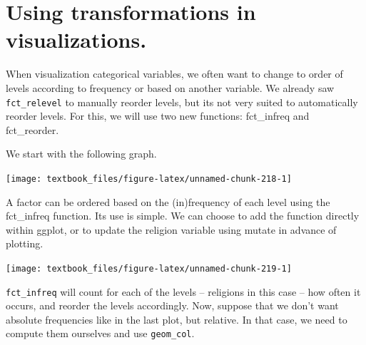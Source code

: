 \documentclass[]{tufte-book}
\newenvironment{Shaded}{}{}
\newcommand{\KeywordTok}[1]{\textcolor[rgb]{0.00,0.44,0.13}{\textbf{#1}}}
\newcommand{\NormalTok}[1]{#1}
\newcommand{\OperatorTok}[1]{\textcolor[rgb]{0.40,0.40,0.40}{#1}}
\newcommand{\StringTok}[1]{\textcolor[rgb]{0.25,0.44,0.63}{#1}}
\begin{document}
\hypertarget{using-transformations-in-visualizations.}{%
\section{Using transformations in visualizations.}\label{using-transformations-in-visualizations.}}

When visualization categorical variables, we often want to change to order of levels according to frequency or based on another variable. We already saw \texttt{fct\_relevel} to manually reorder levels, but its not very suited to automatically reorder levels. For this, we will use two new functions: fct\_infreq and fct\_reorder.

We start with the following graph.

\begin{Shaded}
\end{Shaded}

\texttt{[image: textbook\_files/figure-latex/unnamed-chunk-218-1]}

A factor can be ordered based on the (in)frequency of each level using the fct\_infreq function. Its use is simple. We can choose to add the function directly within ggplot, or to update the religion variable using mutate in advance of plotting.

\begin{Shaded}
\end{Shaded}

\texttt{[image: textbook\_files/figure-latex/unnamed-chunk-219-1]}

\texttt{fct\_infreq} will count for each of the levels -- religions in this case -- how often it occurs, and reorder the levels accordingly. Now, suppose that we don't want absolute frequencies like in the last plot, but relative. In that case, we need to compute them ourselves and use \texttt{geom\_col}.
\end{document}
